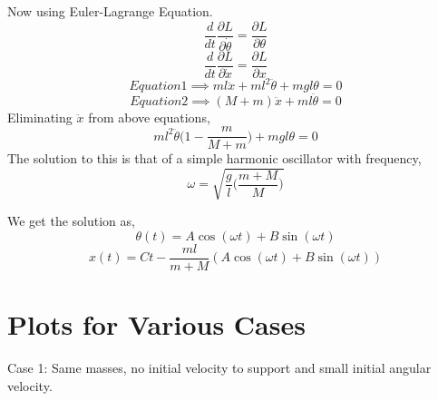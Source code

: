 \documentclass{article}
\begin{document}
	Now using Euler-Lagrange Equation.
	\begin{equation*}
	 	\frac{d}{dt}\frac{\partial L } {\partial \dot{\theta} } = \frac{\partial L}{\partial \theta} \tag{1}
	\end{equation*}
	\begin{equation*}
	 	\frac{d}{dt}\frac{\partial L } {\partial \dot{x} } = \frac{\partial L}{\partial x} \tag{2}
	\end{equation*}
	\begin{equation*}
	 	Equation 1 \implies ml\ddot{x}+ml^2\ddot{\theta}+mgl\theta=0	\tag{a}
	\end{equation*}
	\begin{equation*}
	 	Equation 2 \implies (M+m)\ddot{x}+ml\ddot{\theta}	= 0 \tag{b}
	\end{equation*}
 	Eliminating $ \ddot{x} $ from above equations,
 	\begin{equation*}
		ml^2\ddot{\theta}\biggr(1-\frac{m}{M+m}\biggr) + mgl\theta =0 	
    \end{equation*}
 	The solution to this is that of a simple harmonic oscillator with frequency,
 	\[ \omega = \sqrt{\frac{g}{l}\biggr(\frac{m+M}{M}\biggr)} \]
 
 	We get the solution as,
 	\[ \theta(t) = A \cos(\omega t) + B \sin(\omega t) \]
 	\[ x(t) = Ct - \frac{ml}{m+M}(A \cos(\omega t) + B\sin(\omega t)) \]
 	\newpage
 
 	\section{Plots for Various Cases}
 	\centering
	Case 1:
	Same masses, no initial velocity to support and small initial angular velocity.
	\newline
	
\end{document}
